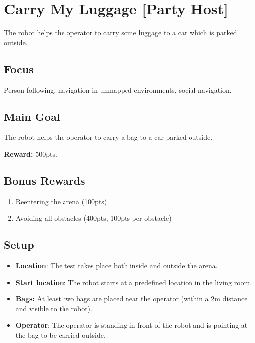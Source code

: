 \section{Carry My Luggage [Party Host]}
\label{test:carry-my-luggage}
The robot helps the operator to carry some luggage to a car which is parked outside.

\subsection*{Focus}
Person following, navigation in unmapped environments, social navigation.

\subsection*{Main Goal}
The robot helps the operator to carry a bag to a car parked outside.

\noindent\textbf{Reward:} 500pts.

\subsection*{Bonus Rewards}
\begin{enumerate}[nosep]
	\item Reentering the arena (100pts)
	\item Avoiding all obstacles (400pts, 100pts per obstacle)
\end{enumerate}


\subsection*{Setup}
\begin{itemize}[nosep]
	\item \textbf{Location}: The test takes place both inside and outside the arena.
	\item \textbf{Start location}: The robot starts at a predefined location in the living room.
	\item \textbf{Bags:} At least two bags are placed near the operator (within a 2m distance and visible to the robot).
	\item \textbf{Operator}: The operator is standing in front of the robot and is pointing at the bag to be carried outside.
\end{itemize}

